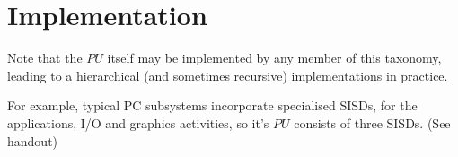 \documentclass[a4paper,12pt]{article}
\begin{document}
\section*{Implementation}

Note that the $PU$ itself may be implemented by any member of this
taxonomy, leading to a hierarchical (and sometimes recursive)
implementations in practice.


For example, typical PC subsystems incorporate specialised  SISDs, for
the applications, I/O and graphics activities, so it's $PU$ consists of
three SISDs. (See handout)
\end{document}

